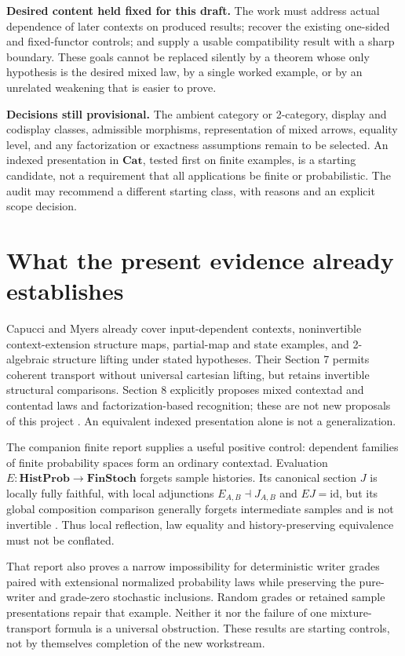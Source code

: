 \documentclass[11pt,a4paper]{article}
\newcommand{\Cat}{\mathbf{Cat}}
\newcommand{\id}{\mathrm{id}}
\newcommand{\FinStoch}{\mathbf{FinStoch}}
\newcommand{\HistProb}{\mathbf{HistProb}}
\begin{document}
\textbf{Desired content held fixed for this draft.} The work must address
actual dependence of later contexts on produced results; recover the existing
one-sided and fixed-functor controls; and supply a usable compatibility result
with a sharp boundary. These goals cannot be replaced silently by a theorem
whose only hypothesis is the desired mixed law, by a single worked example,
or by an unrelated weakening that is easier to prove.

\textbf{Decisions still provisional.} The ambient category or 2-category,
display and codisplay classes, admissible morphisms, representation of mixed
arrows, equality level, and any factorization or exactness assumptions remain
to be selected. An indexed presentation in \(\Cat\), tested first on finite
examples, is a starting candidate, not a requirement that all applications be
finite or probabilistic. The audit may recommend a different starting class,
with reasons and an explicit scope decision.

\section{What the present evidence already establishes}

Capucci and Myers already cover input-dependent contexts, noninvertible
context-extension structure maps, partial-map and state examples, and
2-algebraic structure lifting under stated hypotheses. Their Section 7 permits
coherent transport without universal cartesian lifting, but retains invertible
structural comparisons. Section 8 explicitly proposes mixed contextad and
contentad laws and factorization-based recognition; these are not new proposals
of this project \cite{CM}. An equivalent indexed presentation alone is not a
generalization.

The companion finite report supplies a useful positive control: dependent
families of finite probability spaces form an ordinary contextad. Evaluation
\(E:\HistProb\to\FinStoch\) forgets sample histories. Its canonical section
\(J\) is locally fully faithful, with local adjunctions \(E_{A,B}\dashv J_{A,B}\)
and \(EJ=\id\), but its global composition comparison generally forgets
intermediate samples and is not invertible \cite{Finite}. Thus local reflection,
law equality and history-preserving equivalence must not be conflated.

That report also proves a narrow impossibility for deterministic writer grades
paired with extensional normalized probability laws while preserving the
pure-writer and grade-zero stochastic inclusions. Random grades or retained sample presentations repair
that example. Neither it nor the failure of one mixture-transport formula is
a universal obstruction. These results are starting controls, not by
themselves completion of the new workstream.
\end{document}
